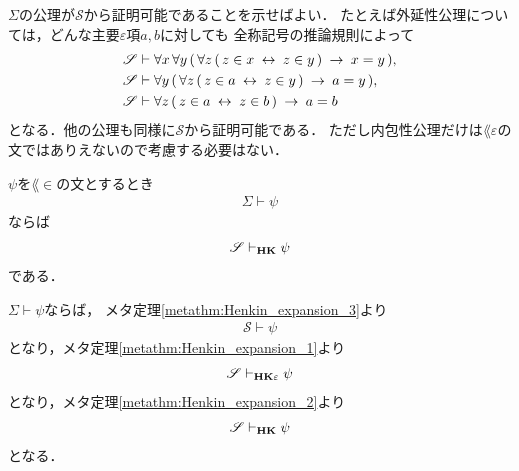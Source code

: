 	\begin{sketch}
		$\Sigma$の公理が$\mathscr{S}$から証明可能であることを示せばよい．
		たとえば外延性公理については，どんな主要$\varepsilon$項$a,b$に対しても
		全称記号の推論規則によって
		\begin{align}
			\mathscr{S} &\vdash \forall x\, \forall y\, (\, \forall z\, 
				(\, z \in x \hspace{0.25em}\leftrightarrow\hspace{0.25em} z \in y\, ) \hspace{0.25em}\rightarrow\hspace{0.25em} x = y\, ), \\
			\mathscr{S} &\vdash \forall y\, (\, \forall z\, 
				(\, z \in a \hspace{0.25em}\leftrightarrow\hspace{0.25em} z \in y\, ) \hspace{0.25em}\rightarrow\hspace{0.25em} a = y\, ), \\
			\mathscr{S} &\vdash \forall z\, 
				(\, z \in a \hspace{0.25em}\leftrightarrow\hspace{0.25em} z \in b\, ) \hspace{0.25em}\rightarrow\hspace{0.25em} a = b
		\end{align}
		となる．他の公理も同様に$\mathscr{S}$から証明可能である．
		ただし内包性公理だけは$\lang{\varepsilon}$の文ではありえないので考慮する必要はない．
		\QED
	\end{sketch}
	
	\begin{screen}
		\begin{metathm}
			$\psi$を$\lang{\in}$の文とするとき
			\begin{align}
				\Sigma \vdash \psi
			\end{align}
			ならば
			\begin{align}
				\mathscr{S} \vdash_{{\scriptsize \mbox{{\bf HK}}}} \psi
			\end{align}
			である．
		\end{metathm}
	\end{screen}
	
	\begin{sketch}
		$\Sigma \vdash \psi$ならば，
		メタ定理\ref{metathm:Henkin_expansion_3}より
		\begin{align}
			\mathscr{S} \vdash \psi
		\end{align}
		となり，メタ定理\ref{metathm:Henkin_expansion_1}より
		\begin{align}
			\mathscr{S} \vdash_{{\scriptsize \mbox{{\bf HK$\varepsilon$}}}} \psi
		\end{align}
		となり，メタ定理\ref{metathm:Henkin_expansion_2}より
		\begin{align}
			\mathscr{S} \vdash_{{\scriptsize \mbox{{\bf HK}}}} \psi
		\end{align}
		となる．
		\QED
	\end{sketch}